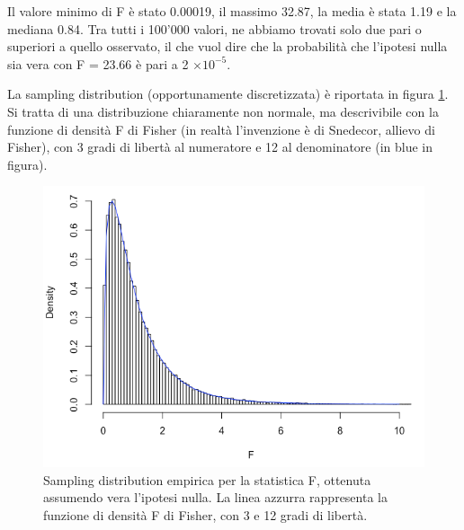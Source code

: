 \documentclass[a4paper,12pt,oneside]{book}
\newenvironment{Shaded}{\begin{snugshade}}{\end{snugshade}}
\newcommand{\CommentTok}[1]{#1}
\begin{document}
\begin{Shaded}
\end{Shaded}

Il valore minimo di F è stato 0.00019, il massimo 32.87, la media è stata 1.19 e la mediana 0.84. Tra tutti i 100'000 valori, ne abbiamo trovati solo due pari o superiori a quello osservato, il che vuol dire che la probabilità che l'ipotesi nulla sia vera con F = 23.66 è pari a 2 \(\times 10^{-5}\).

La sampling distribution (opportunamente discretizzata) è riportata in figura \ref{fig:figName91}. Si tratta di una distribuzione chiaramente non normale, ma descrivibile con la funzione di densità F di Fisher (in realtà l'invenzione è di Snedecor, allievo di Fisher), con 3 gradi di libertà al numeratore e 12 al denominatore (in blue in figura).

\begin{figure}

{\centering \includegraphics[width=0.85\linewidth]{_images/SamplingDistribF} 

}

\caption{Sampling distribution empirica per la statistica F, ottenuta assumendo vera l'ipotesi nulla. La linea azzurra rappresenta la funzione di densità F di Fisher, con 3 e 12 gradi di libertà.}\label{fig:figName91}
\end{figure}
\end{document}
